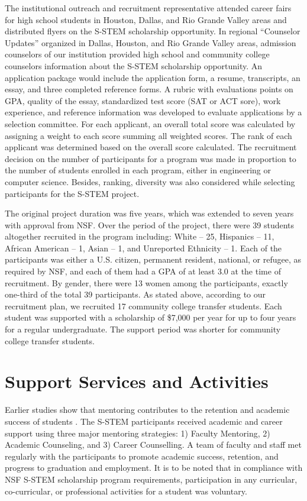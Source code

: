 \documentclass{article}
\begin{document}
The institutional outreach and recruitment representative attended career fairs for high school students in Houston, Dallas, and Rio Grande Valley areas and distributed flyers on the S-STEM scholarship opportunity. In regional “Counselor Updates” organized in Dallas, Houston, and Rio Grande Valley areas, admission counselors of our institution provided high school and community college counselors information about the S-STEM scholarship opportunity. 
An application package would include the application form, a resume, transcripts, an essay, and three completed reference forms. A rubric with evaluations points on GPA, quality of the essay, standardized test score (SAT or ACT sore), work experience, and reference information was developed to evaluate applications by a selection committee. For each applicant, an overall total score was calculated by assigning a weight to each score summing all weighted scores. The rank of each applicant was determined based on the overall score calculated. The recruitment decision on the number of participants for a program was made in proportion to the number of students enrolled in each program, either in engineering or computer science. Besides, ranking, diversity was also considered while selecting participants for the S-STEM project. 

The original project duration was five years, which was extended to seven years with approval from NSF. Over the period of the project, there were 39 students altogether recruited in the program including: White – 25, Hispanics – 11, African American – 1, Asian – 1, and Unreported Ethnicity – 1. Each of the participants was either a U.S. citizen, permanent resident, national, or refugee, as required by NSF, and each of them had a GPA of at least 3.0 at the time of recruitment. By gender, there were 13 women among the participants, exactly one-third of the total 39 participants. As stated above, according to our recruitment plan, we recruited 17 community college transfer students. Each student was supported with a scholarship of \$7,000 per year for up to four years for a regular undergraduate. The support period was shorter for community college transfer students. 

\section{Support Services and Activities}
Earlier studies show that mentoring contributes to the retention and academic success of students \cite{cutright, gershenfeld, yomtov2017peer, slater2006lessons}.  The S-STEM participants received academic and career support using three major mentoring strategies:  1) Faculty Mentoring, 2) Academic Counseling, and 3) Career Counselling. A team of faculty and staff met regularly with the participants to promote academic success, retention, and progress to graduation and employment. It is to be noted that in compliance with NSF S-STEM scholarship program requirements, participation in any curricular, co-curricular, or professional activities for a student was voluntary.
\end{document}
